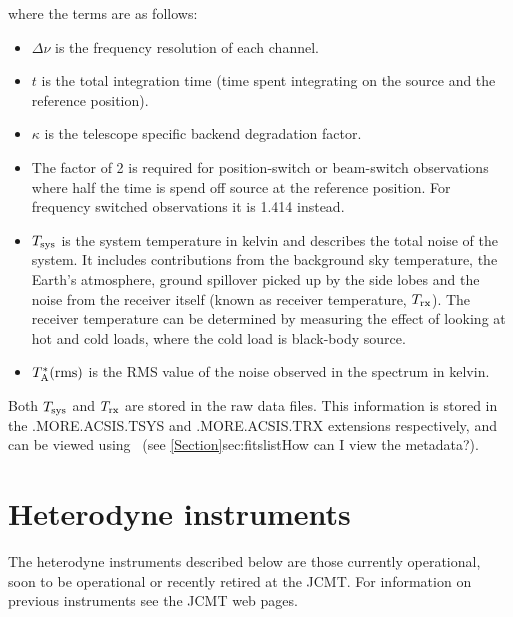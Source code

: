 \documentclass[11pt,oneside,chapters]{starlink}
\begin{document}
where the terms are as follows:
\begin{itemize}
\item $\Delta\nu$ is the frequency resolution of each channel.

\item $t$ is the total integration time (time spent integrating on the
source and the reference position).

\item $\kappa$ is the telescope specific backend degradation factor.

\item The factor of 2 is required for position-switch or beam-switch
observations where half the time is spend off source at the reference
position. For frequency switched observations it is 1.414 instead.

\item $T_{\textnormal{sys}}$ is the system temperature in kelvin and
describes the total noise of the system. It includes contributions
from the background sky temperature, the Earth's atmosphere, ground
spillover picked up by the side lobes and the noise from the receiver
itself (known as receiver temperature, $T_{\textnormal{rx}}$).
The receiver temperature can be determined by measuring the effect of
looking at hot and cold loads, where the cold load is black-body
source.

\item $T^*_{\textnormal{A}}({\textnormal{rms}})$ is the RMS value of the noise observed
in the spectrum in kelvin.
\end{itemize}


\begin{tip}
Both $T_{\textnormal{sys}}$ and $T_{\textnormal{rx}}$ are stored in
the raw data files. This information is stored in the .MORE.ACSIS.TSYS
and .MORE.ACSIS.TRX extensions respectively, and can be viewed using
\HDSTRACE\ (see \cref{Section}{sec:fitslist}{How can I view the
metadata?}).
\end{tip}


\section{Heterodyne instruments}
\label{sec:instruments}

The heterodyne instruments described below are those currently operational,
soon to be operational or recently retired at the JCMT.
For information on previous instruments see the JCMT web pages.
\end{document}
